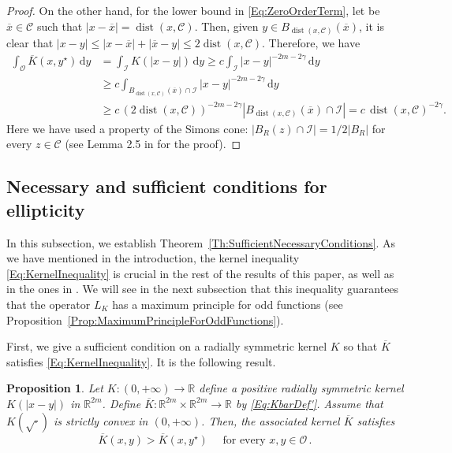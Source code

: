 \documentclass[12pt,reqno]{amsart}
\newtheorem{proposition}[theorem]{Proposition}
\theoremstyle{definition}
\theoremstyle{remark}
\newcommand{\con}[1]{\mathbb{#1}}
\newcommand{\R}{\con{R}} %
\newcommand{\ccal}{\mathscr{C}}
\newcommand{\ical}{\mathcal{I}}
\newcommand{\ocal}{\mathcal{O}}
\newcommand{\s}{\gamma}
\renewcommand{\d}{\,\mathrm{d}} %
\DeclareMathOperator{\dist}{dist}
\numberwithin{equation}{section}
\begin{document}
\begin{proof}
	On the other hand, for the lower bound in \eqref{Eq:ZeroOrderTerm}, let be $\overline{x}\in \ccal$ such that $|x-\overline{x}|=\dist(x,\ccal)$. Then, given $y\in B_{\dist(x,\ccal)}(\overline{x})$, it is clear that $|x-y|\leq |x-\overline{x}|+|\overline{x}-y|\leq 2\dist(x,\ccal)$. Therefore, we have
	\begin{align*}
	\int_{\ocal} \overline{K}(x, y^\star) \d y &=  \int_{\ical} K(|x-y|) \d y \geq c \int_{\ical} |x-y|^{-2m-2\s} \d y \\
	&\geq c \int_{B_{\dist(x,\ccal)}(\overline{x})\cap \ical} |x-y|^{-2m-2\s} \d y\\
	&\geq c \, (2\dist(x,\ccal))^{-2m-2\s} |B_{\dist(x,\ccal)}(\overline{x})\cap \ical| = c \,\dist(x,\ccal)^{-2\s}.
	\end{align*}
	Here we have used a property of the Simons cone: $|B_R(z)\cap \ical|=1/2|B_R|$ for every $z\in \ccal$ (see Lemma 2.5 in \cite{Felipe-Sanz-Perela:SaddleFractional} for the proof).
\end{proof}


\subsection{Necessary and sufficient conditions for ellipticity}




In this subsection, we establish Theorem~\ref{Th:SufficientNecessaryConditions}. As we have mentioned in the introduction, the kernel inequality \eqref{Eq:KernelInequality} is crucial in the rest of the results of this paper, as well as in the ones in \cite{FelipeSanz-Perela:IntegroDifferentialII}. We will see in the next subsection that this inequality guarantees that the operator $L_K$ has a maximum principle for odd functions (see Proposition~\ref{Prop:MaximumPrincipleForOddFunctions}).

First, we give a sufficient condition on a radially symmetric kernel $K$ so that $\overline{K}$ satisfies \eqref{Eq:KernelInequality}. It is the following result.

\begin{proposition}
	\label{Prop:KernelInequalitySufficientCondition} 
	Let $K:(0,+\infty) \to \R$ define a positive radially symmetric kernel $K(|x-y|)$ in $\R^{2m}$. Define $\overline{K} : \R^{2m}\times \R^{2m} \to \R$ by \eqref{Eq:KbarDef'}. Assume that $K(\sqrt{\cdot})$ is strictly convex in $(0,+\infty)$. Then, the associated kernel $\overline{K}$ satisfies
	\begin{equation}
	\label{Eq:KernelInequalityBis}
	\overline{K}(x,y) > \overline{K}(x, y^\star) \quad \text{ for every }x,y \in \ocal\,.
	\end{equation}
\end{proposition}
\end{document}
